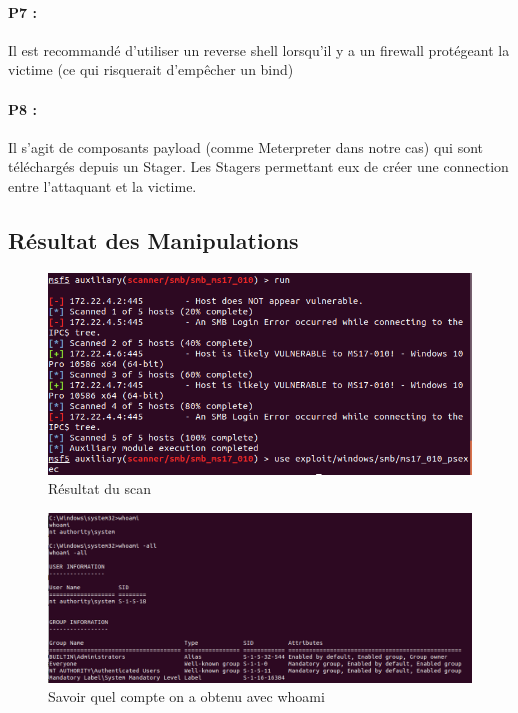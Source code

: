 \documentclass[12pt]{report} %
\begin{document}
\paragraph{P7 :} Il est recommandé d'utiliser un reverse shell lorsqu'il y a un firewall protégeant la victime (ce qui risquerait d'empêcher un bind)
\paragraph{P8 :} Il s'agit de composants payload (comme Meterpreter dans notre cas) qui sont téléchargés depuis un Stager.
Les Stagers permettant eux de créer une connection entre l'attaquant et la victime.

\newpage
\subsection*{Résultat des Manipulations}

\begin{figure}[!h]
	\includegraphics[width=17cm]{3_2-Scann.PNG}
	\caption*{Résultat du scan}
\end{figure}

\begin{figure}[!h]
	\includegraphics[width=17cm]{who_am_i_3_2.PNG}
	\caption*{Savoir quel compte on a obtenu avec whoami}
\end{figure}
\end{document}
